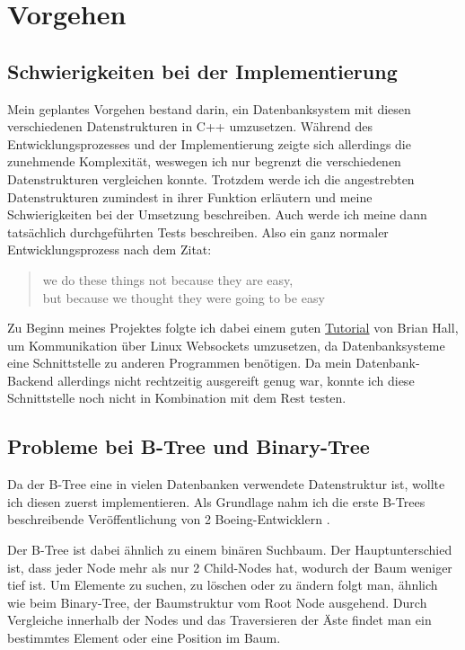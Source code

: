 \documentclass[11pt,a4paper]{article}
\begin{document}
\section{Vorgehen}

\subsection{Schwierigkeiten bei der Implementierung}

Mein geplantes Vorgehen bestand darin, ein Datenbanksystem mit diesen
verschiedenen Datenstrukturen in C++ umzusetzen.
Während des Entwicklungsprozesses und der Implementierung zeigte sich allerdings die
zunehmende Komplexität, weswegen ich nur begrenzt die verschiedenen Datenstrukturen
vergleichen konnte. Trotzdem werde ich die angestrebten Datenstrukturen
zumindest in ihrer Funktion erläutern und meine Schwierigkeiten bei der Umsetzung
beschreiben.
Auch werde ich meine dann tatsächlich durchgeführten Tests beschreiben.
Also ein ganz normaler Entwicklungsprozess nach dem Zitat:

\begin{quote}
    \guillemetright we do these things not because they are easy, \\
    \hspace*{0.2em} but because we thought they were going to be easy\guillemetleft
\end{quote}

Zu Beginn meines Projektes folgte ich dabei einem guten
\href{https://beej.us/guide/bgnet/html/}{Tutorial}
von Brian Hall, um Kommunikation über Linux Websockets umzusetzen, da Datenbanksysteme
eine Schnittstelle zu anderen Programmen benötigen.
Da mein Datenbank-Backend allerdings nicht rechtzeitig ausgereift genug war, konnte
ich diese Schnittstelle noch nicht in Kombination mit dem Rest testen.

\subsection{Probleme bei B-Tree und Binary-Tree}

Da der B-Tree eine in vielen Datenbanken verwendete Datenstruktur ist, wollte ich
diesen zuerst implementieren. Als Grundlage nahm ich die erste B-Trees beschreibende
Veröffentlichung von 2 Boeing-Entwicklern \cite{boeing_engineers}.

\vspace*{0.3cm}

Der B-Tree ist dabei ähnlich zu einem binären Suchbaum.
Der Hauptunterschied ist, dass jeder Node mehr als nur 2 Child-Nodes
hat, wodurch der Baum weniger tief ist.
Um Elemente zu suchen, zu löschen oder zu ändern folgt man, ähnlich wie beim
Binary-Tree, der Baumstruktur vom Root Node ausgehend.
Durch Vergleiche innerhalb der Nodes und das Traversieren der
Äste findet man ein bestimmtes Element oder eine Position im Baum.
\end{document}
